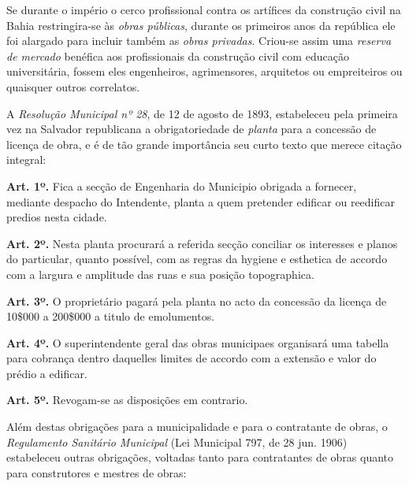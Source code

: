 Se durante o império o cerco profissional contra os artífices da construção civil na Bahia restringira-se às \textit{obras públicas}, durante os primeiros anos da república ele foi alargado para incluir também as \textit{obras privadas}. Criou-se assim uma \textit{reserva de mercado} benéfica aos profissionais da construção civil com educação universitária, fossem eles engenheiros, agrimensores, arquitetos ou empreiteiros ou quaisquer outros correlatos.

A \textit{Resolução Municipal nº 28}, de 12 de agosto de 1893, estabeleceu pela primeira vez na Salvador republicana a obrigatoriedade de \textit{planta} para a concessão de licença de obra, e é de tão grande importância seu curto texto que merece citação integral:

\begin{citacao}
\textbf{Art. 1º.} Fica a secção de Engenharia do Municipio obrigada a fornecer, mediante despacho do Intendente, planta a quem pretender edificar ou reedificar predios nesta cidade.

\textbf{Art. 2º.} Nesta planta procurará a referida secção conciliar os interesses e planos do particular, quanto possível, com as regras da hygiene e esthetica de accordo com a largura e amplitude das ruas e sua posição topographica.

\textbf{Art. 3º.} O proprietário pagará pela planta no acto da concessão da licença de 10\$000 a 200\$000 a titulo de emolumentos.

\textbf{Art. 4º.} O superintendente geral das obras municipaes organisará uma tabella para cobrança dentro daquelles limites de accordo com a extensão e valor do prédio a edificar.

\textbf{Art. 5º.} Revogam-se as disposições em contrario.
\end{citacao}

Além destas obrigações para a municipalidade e para o contratante de obras, o \textit{Regulamento Sanitário Municipal} (Lei Municipal 797, de 28 jun. 1906) \cite{prefeitura_sanitario_1906} estabeleceu outras obrigações, voltadas tanto para contratantes de obras quanto para construtores e mestres de obras:

